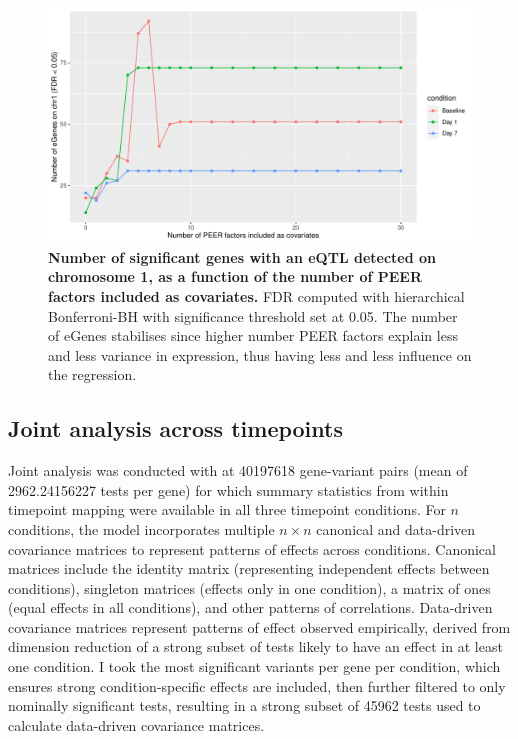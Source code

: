 \begin{figure}
    \centering
    \includegraphics[width=1.0\textwidth,page=1]{mainmatter/figures/chapter_03/count_eGenes.signif_eGenes_vs_PEER_n.dataset_mega.chr_chr1.pdf}
    \caption{
        \textbf{Number of significant genes with an \gls{eQTL} detected on chromosome 1, as a function of the number of PEER factors included as covariates.}
        \gls{FDR} computed with hierarchical Bonferroni-\gls{BH} \autocite{huang2018PowerFalseDiscovery} with significance threshold set at 0.05.
        The number of eGenes stabilises since higher number PEER factors explain less and less variance in expression, thus having less and less influence on the regression.
    }
    \label{fig:hird_neGenesvsPeerK}
\end{figure}

\subsection{Joint  analysis across timepoints}
\label{subsec:hird_reQTL_mashr}

Joint analysis was conducted with  \autocite{urbut2018FlexibleStatisticalMethods} at \num{40197618} gene-variant pairs (mean of \num[round-mode=places,round-precision=0]{2962.24156227} tests per gene) for which summary statistics from within timepoint mapping were available in all three timepoint conditions.
For $n$ conditions, the  model incorporates multiple $n \times n$ canonical and data-driven covariance matrices to represent patterns of effects across conditions.
Canonical matrices include the identity matrix (representing independent effects between conditions), singleton matrices (effects only in one condition), a matrix of ones (equal effects in all conditions), and other patterns of correlations.
Data-driven covariance matrices represent patterns of effect observed empirically, derived from dimension reduction of a strong subset of tests likely to have an effect in at least one condition.
I took the most significant variants per gene per condition, 
which ensures strong condition-specific effects are included,
then further filtered to only nominally significant tests, 
resulting in a strong subset of 45962 tests used to calculate data-driven covariance matrices.

